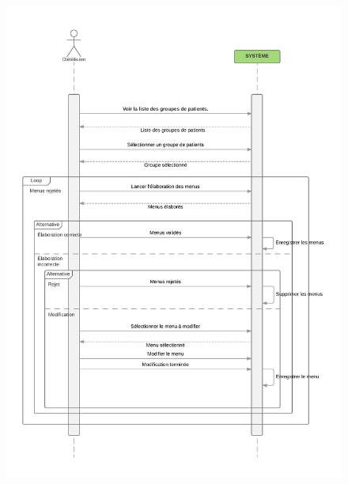 \documentclass{beamer}
\begin{document}
\begin{frame}[plain]{}
\begin{figure}
\centering
\includegraphics[scale=0.080]{../CasDUtilisations/MenuGen/Sequence/ElaborationMenus.png}
\end{figure}
\end{frame}
\end{document}
